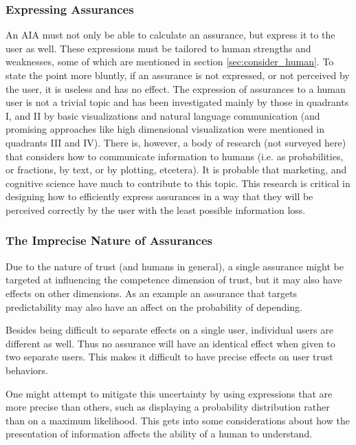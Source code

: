 \subsubsection{Expressing Assurances}
    An AIA must not only be able to calculate an assurance, but express it to the user as well. These expressions must be tailored to human strengths and weaknesses, some of which are mentioned in section \ref{sec:consider_human}. To state the point more bluntly, if an assurance is not expressed, or not perceived by the user, it is useless and has no effect. The expression of assurances to a human user is not a trivial topic and has been investigated mainly by those in quadrants I, and II by basic visualizations and natural language communication (and promising approaches like high dimensional visualization were mentioned in quadrants III and IV). There is, however, a body of research (not surveyed here) that considers how to communicate information to humans (i.e. as probabilities, or fractions, by text, or by plotting, etcetera). It is probable that marketing, and cognitive science have much to contribute to this topic. This research is critical in designing how to efficiently express assurances in a way that they will be perceived correctly by the user with the least possible information loss.

\subsubsection{The Imprecise Nature of Assurances}
    Due to the nature of trust (and humans in general), a single assurance might be targeted at influencing the competence dimension of trust, but it may also have effects on other dimensions. As an example an assurance that targets predictability may also have an affect on the probability of depending.

    Besides being difficult to separate effects on a single user, individual users are different as well. Thus no assurance will have an identical effect when given to two separate users. This makes it difficult to have precise effects on user trust behaviors.

    One might attempt to mitigate this uncertainty by using expressions that are more precise than others, such as displaying a probability distribution rather than on a maximum likelihood. This gets into some considerations about how the presentation of information affects the ability of a human to understand.
